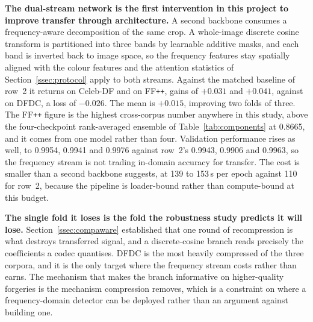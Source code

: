\documentclass[journal,onecolumn]{IEEEtran}
\newcommand{\celebdf}{Celeb-DF}
\newcommand{\ffpp}{FF\texttt{++}}
\newcommand{\dfdc}{DFDC}
\begin{document}
\textbf{The dual-stream network is the first intervention in this project to
improve transfer through architecture.} A second backbone consumes a
frequency-aware decomposition of the same crop. A whole-image discrete cosine
transform is partitioned into three bands by learnable additive masks, and each
band is inverted back to image space, so the frequency features stay spatially
aligned with the colour features and the attention statistics of
Section~\ref{ssec:protocol} apply to both streams. Against the matched
baseline of row~2 it returns \dsCeleb{} on \celebdf{} and \dsFF{} on \ffpp{},
gains of $+0.031$ and $+0.041$, against \dsDFDC{} on \dfdc{}, a loss of
$-0.026$. The mean is $+0.015$, improving two folds of three. The \ffpp{}
figure is the highest cross-corpus number anywhere in this study, above the
four-checkpoint rank-averaged ensemble of Table~\ref{tab:components} at 0.8665,
and it comes from one model rather than four. Validation performance rises as
well, to 0.9954, 0.9941 and 0.9976 against row~2's 0.9943, 0.9906 and 0.9963,
so the frequency stream is not trading in-domain accuracy for transfer. The
cost is smaller than a second backbone suggests, at 139 to 153\,s per epoch
against 110 for row~2, because the pipeline is loader-bound rather than
compute-bound at this budget.

\textbf{The single fold it loses is the fold the robustness study predicts it
will lose.} Section~\ref{ssec:compaware} established that one round of
recompression is what destroys transferred signal, and a discrete-cosine branch
reads precisely the coefficients a codec quantises. \dfdc{} is the most heavily
compressed of the three corpora, and it is the only target where the frequency
stream costs rather than earns. The mechanism that makes the branch informative
on higher-quality forgeries is the mechanism compression removes, which is a
constraint on where a frequency-domain detector can be deployed rather than an
argument against building one.
\end{document}
